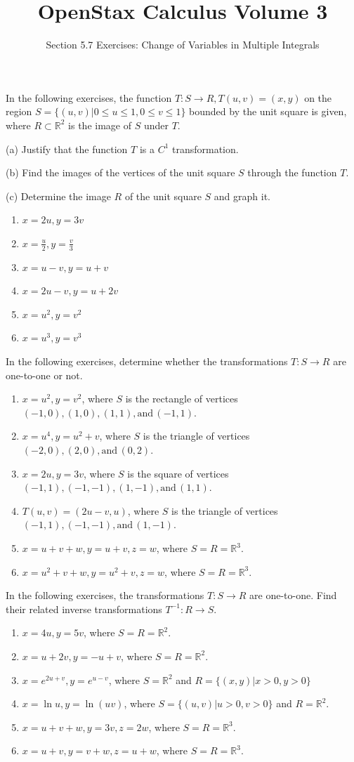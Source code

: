 \documentclass{exercises}
\title{OpenStax Calculus Volume 3}
\subtitle{Section 5.7 Exercises: Change of Variables in Multiple Integrals}
\author{}
\date{}
\begin{document}
\maketitle


In the following exercises, the function $T:S\to R,T(u,v)=(x,y)$ on the region $S=\{(u,v)|0\le u\le1,0\le v\le1\}$ bounded by the unit square is given, where $R\subset \mathbb{R}^{2}$ is the image of $S$ under $T$.


(a) Justify that the function $T$ is a $C^{1}$ transformation.


(b) Find the images of the vertices of the unit square $S$ through the function $T$.


(c) Determine the image $R$ of the unit square $S$ and graph it.

\begin{enumerate}[start=1]
\item $x=2u,y=3v$
\item $x=\frac{u}{2},y=\frac{v}{3}$
\item $x=u-v,y=u+v$
\item $x=2u-v,y=u+2v$
\item $x=u^{2},y=v^{2}$
\item $x=u^{3},y=v^{3}$
\end{enumerate}

In the following exercises, determine whether the transformations $T:S\to R$ are one-to-one or not.

\begin{enumerate}[resume]
\item $x=u^{2},y=v^{2}$, where $S$ is the rectangle of vertices $(-1,0),(1,0),(1,1),\text{and}\,(-1,1)$.
\item $x=u^{4},y=u^{2}+v$, where $S$ is the triangle of vertices $(-2,0),(2,0),\text{and}\,(0,2)$.
\item $x=2u,y=3v$, where $S$ is the square of vertices $(-1,1),(-1,-1),(1,-1),\text{and}\,(1,1)$.
\item $T(u,v)=(2u-v,u)$, where $S$ is the triangle of vertices $(-1,1),(-1,-1),\text{and}\,(1,-1)$.
\item $x=u+v+w,y=u+v,z=w$, where $S=R=\mathbb{R}^{3}$.
\item $x=u^{2}+v+w,y=u^{2}+v,z=w$, where $S=R=\mathbb{R}^{3}$.
\end{enumerate}

In the following exercises, the transformations $T:S\to R$ are one-to-one. Find their related inverse transformations $T^{-1}:R\to S$.

\begin{enumerate}[resume]
\item $x=4u,y=5v$, where $S=R=\mathbb{R}^{2}$.
\item $x=u+2v,y=-u+v$, where $S=R=\mathbb{R}^{2}$.
\item $x=e^{2u+v},y=e^{u-v}$, where $S=\mathbb{R}^{2}$ and $R=\{(x,y)|x>0,y>0\}$
\item $x=\ln u,y=\ln(uv)$, where $S=\{(u,v)|u>0,v>0\}$ and $R=\mathbb{R}^{2}$.
\item $x=u+v+w,y=3v,z=2w$, where $S=R=\mathbb{R}^{3}$.
\item $x=u+v,y=v+w,z=u+w$, where $S=R=\mathbb{R}^{3}$.
\end{enumerate}
\end{document}
